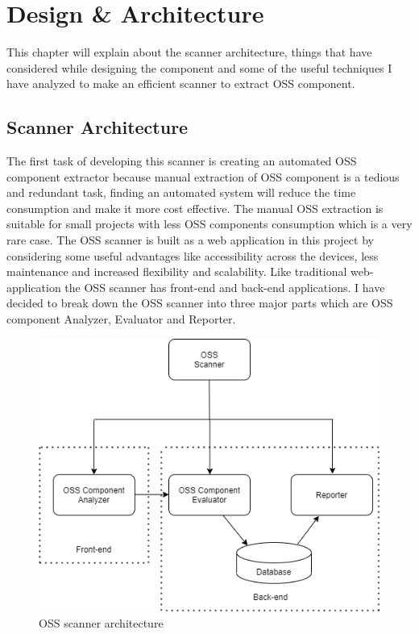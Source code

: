%
\section{Design \& Architecture}\label{sec:design_architecture}
%
This chapter will explain about the scanner architecture, things that have considered while designing the component and some of the useful techniques I have analyzed to make an efficient scanner to extract \acs{OSS} component.

\subsection{Scanner Architecture}
 The first task of developing this scanner is creating an automated \acs{OSS} component extractor because manual extraction of \acs{OSS} component is a tedious and redundant task, finding an automated system will reduce the time consumption and make it more cost effective. The manual \acs{OSS} extraction is suitable for small projects with less \acs{OSS} components consumption which is a very rare case. The \acs{OSS} scanner is built as a web application in this project by considering some useful advantages like accessibility across the devices, less maintenance and increased flexibility and scalability. Like traditional web-application the OSS scanner has front-end and back-end applications. I have decided to break down the OSS scanner into three major parts which are OSS component Analyzer, Evaluator and Reporter. 
 \begin{figure}[h!]
 	\includegraphics[width=15cm]{includes/architetcure.png}
 	\centering
 	\caption{\acs{OSS} scanner architecture}
 	\label{fig:architecture}
 \end{figure}
